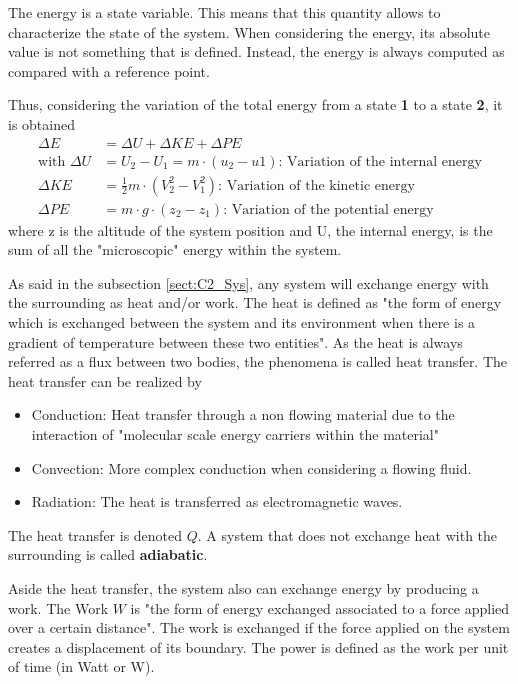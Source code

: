 The energy is a state variable. This means that this quantity allows to characterize the state of the system. When considering the energy, its absolute value is not something that is defined. Instead, the energy is always computed as compared with a reference point.

Thus, considering the variation of the total energy from a state \textbf{1} to a state \textbf{2}, it is obtained
\begin{align}
    \Delta E &= \Delta U + \Delta KE + \Delta PE \label{eq:C2_E}\\
    \text{with } \Delta U  &= U_2 - U_1 =  m\cdot(u_2 - u1) \text{: Variation of the internal energy}\nonumber\\
                 \Delta KE &= \frac{1}{2}m\cdot(V^2_2 - V^2_1)\text{: Variation of the kinetic energy}\nonumber\\
                 \Delta PE &= m\cdot g\cdot(z_2 - z_1)\text{: Variation of the potential energy}\nonumber
\end{align} 
where z is the altitude of the system position and U, the internal energy, is the sum of all the "microscopic" energy within the system.

As said in the subsection \ref{sect:C2_Sys}, any system will exchange energy with the surrounding as heat and/or work. The heat is defined as "the form of energy which is exchanged between the system and its environment when there is a gradient of temperature between these two entities". As the heat is always referred as a flux between two bodies, the phenomena is called heat transfer. The heat transfer can be realized by
\begin{itemize}
    \item Conduction: Heat transfer through a non flowing material due to the interaction of "molecular scale energy carriers within the material"\cite{GregoryNellis2015}
    \item Convection: More complex conduction when considering a flowing fluid.
    \item Radiation: The heat is transferred as electromagnetic waves.
\end{itemize}
The heat transfer is denoted $Q$. A system that does not exchange heat with the surrounding is called \textbf{adiabatic}.

Aside the heat transfer, the system also can exchange energy by producing a work. The Work $W$ is "the form of energy exchanged associated to a force applied over a certain distance". The work is exchanged if the force applied on the system creates a displacement of its boundary. The power is defined as the work per unit of time (in Watt or W).

